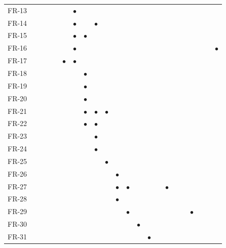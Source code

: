 \documentclass[11pt,a4paper]{article}
\begin{document}
\begin{longtable}{@{}l*{21}{c}@{}}
FR-13&&&&&&\cellcolor{hdr}\textcolor{creBlue}{$\bullet$}&&&&&&&&&&&&&&&\\
FR-14&&&&&&\cellcolor{hdr}\textcolor{creBlue}{$\bullet$}&&\cellcolor{hdr}\textcolor{creBlue}{$\bullet$}&&&&&&&&&&&&&\\
FR-15&&&&&&\cellcolor{hdr}\textcolor{creBlue}{$\bullet$}&\cellcolor{hdr}\textcolor{creBlue}{$\bullet$}&&&&&&&&&&&&&&\\
FR-16&&&&&&\cellcolor{hdr}\textcolor{creBlue}{$\bullet$}&&&&&&&&&&&&&&&\cellcolor{hdr}\textcolor{creBlue}{$\bullet$}\\
FR-17&&&&&\cellcolor{hdr}\textcolor{creBlue}{$\bullet$}&\cellcolor{hdr}\textcolor{creBlue}{$\bullet$}&&&&&&&&&&&&&&&\\
FR-18&&&&&&&\cellcolor{hdr}\textcolor{creBlue}{$\bullet$}&&&&&&&&&&&&&&\\
FR-19&&&&&&&\cellcolor{hdr}\textcolor{creBlue}{$\bullet$}&&&&&&&&&&&&&&\\
FR-20&&&&&&&\cellcolor{hdr}\textcolor{creBlue}{$\bullet$}&&&&&&&&&&&&&&\\
FR-21&&&&&&&\cellcolor{hdr}\textcolor{creBlue}{$\bullet$}&\cellcolor{hdr}\textcolor{creBlue}{$\bullet$}&\cellcolor{hdr}\textcolor{creBlue}{$\bullet$}&&&&&&&&&&&&\\
FR-22&&&&&&&\cellcolor{hdr}\textcolor{creBlue}{$\bullet$}&\cellcolor{hdr}\textcolor{creBlue}{$\bullet$}&&&&&&&&&&&&&\\
FR-23&&&&&&&&\cellcolor{hdr}\textcolor{creBlue}{$\bullet$}&&&&&&&&&&&&&\\
FR-24&&&&&&&&\cellcolor{hdr}\textcolor{creBlue}{$\bullet$}&&&&&&&&&&&&&\\
FR-25&&&&&&&&&\cellcolor{hdr}\textcolor{creBlue}{$\bullet$}&&&&&&&&&&&&\\
FR-26&&&&&&&&&&\cellcolor{hdr}\textcolor{creBlue}{$\bullet$}&&&&&&&&&&&\\
FR-27&&&&&&&&&&\cellcolor{hdr}\textcolor{creBlue}{$\bullet$}&\cellcolor{hdr}\textcolor{creBlue}{$\bullet$}&&&&\cellcolor{hdr}\textcolor{creBlue}{$\bullet$}&&&&&&\\
FR-28&&&&&&&&&&\cellcolor{hdr}\textcolor{creBlue}{$\bullet$}&&&&&&&&&&&\\
FR-29&&&&&&&&&&&\cellcolor{hdr}\textcolor{creBlue}{$\bullet$}&&&&&&&\cellcolor{hdr}\textcolor{creBlue}{$\bullet$}&&&\\
FR-30&&&&&&&&&&&&\cellcolor{hdr}\textcolor{creBlue}{$\bullet$}&&&&&&&&&\\
FR-31&&&&&&&&&&&&&\cellcolor{hdr}\textcolor{creBlue}{$\bullet$}&&&&&&&&\\

\end{longtable}
\end{document}

